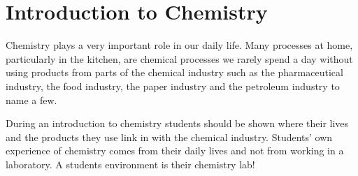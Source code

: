 \section{Introduction to Chemistry} 



Chemistry plays a very important role in our
daily life. Many processes at home, particularly
in the kitchen, are chemical processes we rarely
spend a day without using products from parts
of the chemical industry such as the
pharmaceutical industry, the food industry, the
paper industry and the petroleum industry to
name a few.

During an introduction to chemistry students
should be shown where their lives and the
products they use link in with the chemical
industry. Students' own experience of chemistry comes
from their daily lives and not from working in a
laboratory. A students environment is their
chemistry lab!

